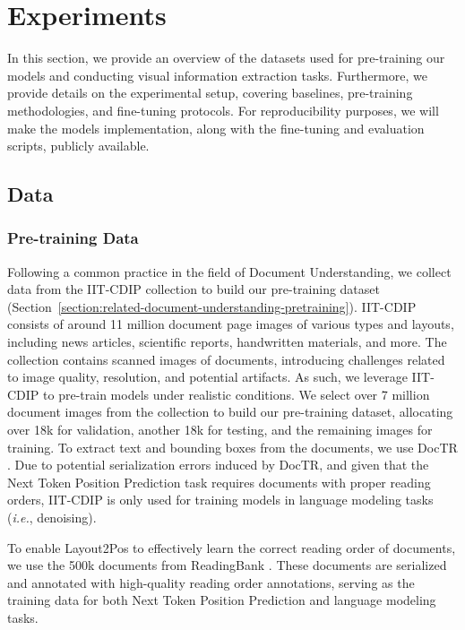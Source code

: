 \section{Experiments}

In this section, we provide an overview of the datasets used for pre-training our models and conducting visual information extraction tasks. Furthermore, we provide details on the experimental setup, covering baselines, pre-training methodologies, and fine-tuning protocols. For reproducibility purposes, we will make the models implementation, along with the fine-tuning and evaluation scripts, publicly available. 


\subsection{Data}

\subsubsection{Pre-training Data}

Following a common practice in the field of Document Understanding, we collect data from the IIT-CDIP collection \citep{lewis2006building} to build our pre-training dataset (Section~\ref{section:related-document-understanding-pretraining}). IIT-CDIP consists of around 11 million document page images of various types and layouts, including news articles, scientific reports, handwritten materials, and more. The collection contains scanned images of documents, introducing challenges related to image quality, resolution, and potential artifacts. As such, we leverage IIT-CDIP to pre-train models under realistic conditions. We select over 7 million document images from the collection to build our pre-training dataset, allocating over 18k for validation, another 18k for testing, and the remaining images for training. To extract text and bounding boxes from the documents, we use DocTR \citep{doctr2021}. Due to potential serialization errors induced by DocTR, and given that the Next Token Position Prediction task requires documents with proper reading orders, IIT-CDIP is only used for training models in language modeling tasks (\textit{i.e.}, denoising). 

To enable Layout2Pos to effectively learn the correct reading order of documents, we use the 500k documents from ReadingBank \citep{wang2021layoutreader}. These documents are serialized and annotated with high-quality reading order annotations, serving as the training data for both Next Token Position Prediction and language modeling tasks. 

